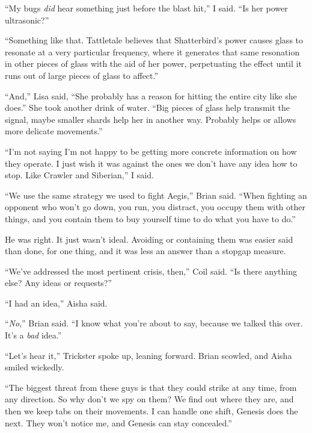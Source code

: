 ``My bugs \emph{did} hear something just before the blast hit,'' I said.  ``Is her power ultrasonic?''



``Something like that.  Tattletale believes that Shatterbird's power causes glass to resonate at a very particular frequency, where it generates that same resonation in other pieces of glass with the aid of her power, perpetuating the effect until it runs out of large pieces of glass to affect.''



``And,'' Lisa said, ``She probably has a reason for hitting the entire city like she does.''  She took another drink of water.  ``Big pieces of glass help transmit the signal, maybe smaller shards help her in another way.  Probably helps or allows more delicate movements.''



``I'm not saying I'm not happy to be getting more concrete information on how they operate.  I just wish it was against the ones we don't have any idea how to stop.  Like Crawler and Siberian,'' I said.



``We use the same strategy we used to fight Aegis,'' Brian said.  ``When fighting an opponent who won't go down, you run, you distract, you occupy them with other things, and you contain them to buy yourself time to do what you have to do.''



He was right.  It just wasn't ideal.  Avoiding or containing them was easier said than done, for one thing, and it was less an answer than a stopgap measure.



``We've addressed the most pertinent crisis, then,'' Coil said.  ``Is there anything else?  Any ideas or requests?''



``I had an idea,'' Aisha said.



``\emph{No},'' Brian said.  ``I know what you're about to say, because we talked this over.  It's a \emph{bad} idea.''



``Let's hear it,'' Trickster spoke up, leaning forward.  Brian scowled, and Aisha smiled wickedly.



``The biggest threat from these guys is that they could strike at any time, from any direction.  So why don't we spy on them?  We find out where they are, and then we keep tabs on their movements.  I can handle one shift, Genesis does the next.  They won't notice me, and Genesis can stay concealed.''



